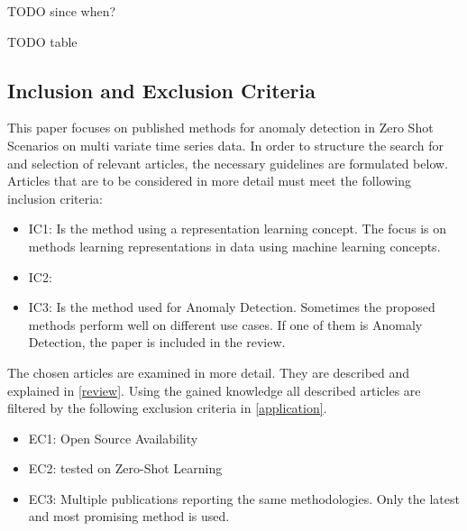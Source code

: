 TODO since when?

TODO table
\subsection{Inclusion and Exclusion Criteria}\label{criteria}
This paper focuses on published methods for anomaly detection in Zero Shot Scenarios on multi variate time series data. In order to structure the search for and selection of relevant articles, the necessary guidelines are formulated below. Articles that are to be considered in more detail must meet the following inclusion criteria:
\begin{itemize}
\item IC1: Is the method using a representation learning concept. The focus is on methods learning representations in data using machine learning concepts.
\item IC2: 
\item IC3: Is the method used for Anomaly Detection. Sometimes the proposed methods perform well on different use cases. If one of them is Anomaly Detection, the paper is included in the review.
\end{itemize}
The chosen articles are examined in more detail. They are described and explained in \ref{review}. Using the gained knowledge all described articles are filtered by the following exclusion criteria in \ref{application}.
\begin{itemize}
\item EC1: Open Source Availability
\item EC2: tested on Zero-Shot Learning
\item EC3: Multiple publications reporting the same methodologies. Only the latest and most promising method is used.
\end{itemize}
